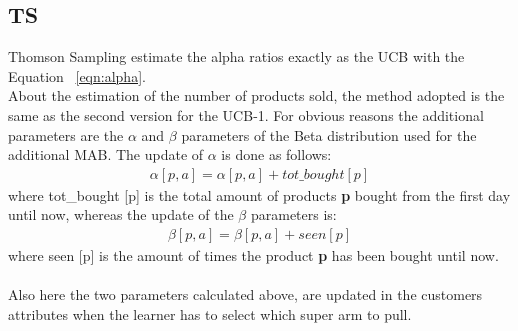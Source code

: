 \subsection{TS}
Thomson Sampling estimate the alpha ratios exactly as the UCB with the Equation ~\ref{eqn:alpha}.\\About the estimation of the number of products sold, the method adopted is the same as the second version for the UCB-1. For obvious reasons the additional parameters are the $\alpha$ and $\beta$ parameters of the Beta distribution used for the additional MAB. The update of $\alpha$ is done as follows:
\begin{align*}
    \alpha[p, a] = \alpha[p, a] + tot\_bought[p]
\end{align*}
where tot\_bought [p] is the total amount of products {\bf p} bought from the first day until now, whereas the update of the $\beta$ parameters is:
\begin{align*}
    \beta[p, a] = \beta [p, a] + seen[p]
\end{align*}
where seen [p] is the amount of times the product {\bf p} has been bought until now.\\\\
Also here the two parameters calculated above, are updated in the customers attributes when the learner has to select which super arm to pull.\\

